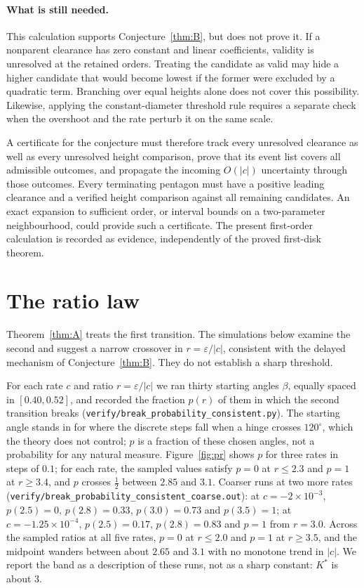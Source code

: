 \documentclass[11pt]{amsart}
\theoremstyle{definition}
\newcommand{\eps}{\varepsilon}
\begin{document}
\paragraph{What is still needed.}
This calculation supports Conjecture~\ref{thm:B}, but does not prove it. If a nonparent
clearance has zero constant and linear coefficients, validity is unresolved at the retained
orders. Treating the candidate as valid may hide a higher candidate that would become lowest
if the former were excluded by a quadratic term. Branching over equal heights alone does
not cover this possibility. Likewise, applying the constant-diameter threshold rule requires
a separate check when the overshoot and the rate perturb it on the same scale.

A certificate for the conjecture must therefore track every unresolved clearance as well as
every unresolved height comparison, prove that its event list covers all admissible outcomes,
and propagate the incoming $O(|c|)$ uncertainty through those outcomes. Every terminating
pentagon must have a positive leading clearance and a verified height comparison against all
remaining candidates. An exact expansion to sufficient order, or interval bounds on a
two-parameter neighbourhood, could provide such a certificate. The present first-order
calculation is recorded as evidence, independently of the proved first-disk theorem.

\section{The ratio law}\label{sec:numerics}

Theorem~\ref{thm:A} treats the first transition. The simulations below examine the second
and suggest a narrow crossover in $r=\eps/|c|$, consistent with the delayed mechanism of
Conjecture~\ref{thm:B}. They do not establish a sharp threshold.

For each rate $c$ and ratio $r=\eps/|c|$ we ran thirty starting angles $\beta$, equally spaced in
$[0.40,0.52]$, and recorded the fraction $p(r)$ of them in which the second transition breaks
(\texttt{verify/break\_probability\_consistent.py}). The starting angle stands in for where the discrete steps
fall when a hinge crosses $120^\circ$, which the theory does not control; $p$ is a fraction of these chosen
angles, not a probability for any natural measure. Figure~\ref{fig:pr} shows $p$ for three rates in steps of
$0.1$; for each rate, the sampled values satisfy $p=0$ at $r\le2.3$ and $p=1$ at $r\ge3.4$, and $p$ crosses $\tfrac12$ between $2.85$ and
$3.1$. Coarser runs at two more rates (\texttt{verify/break\_probability\_consistent\_coarse.out}): at
$c=-2\times10^{-3}$, $p(2.5)=0$, $p(2.8)=0.33$, $p(3.0)=0.73$ and $p(3.5)=1$; at $c=-1.25\times10^{-4}$,
$p(2.5)=0.17$, $p(2.8)=0.83$ and $p=1$ from $r=3.0$. Across the sampled ratios at all five rates, $p=0$ at $r\le2.0$ and $p=1$ at
$r\ge3.5$, and the midpoint wanders between about $2.65$ and $3.1$ with no monotone trend in $|c|$. We report
the band as a description of these runs, not as a sharp constant: $K^*$ is about $3$.
\end{document}
